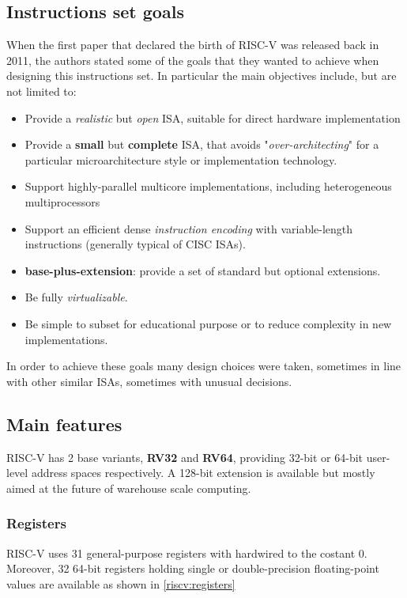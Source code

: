\documentclass[12pt,oneside,a4paper]{article}
\begin{document}
\subsection{Instructions set goals}
When the first paper that declared the birth of RISC-V \cite{risc-v_original} was released back in 2011, the authors stated some of the goals that they wanted to achieve when designing this instructions set. In particular the main objectives include, but are not limited to:
\begin{itemize}
	\item Provide a \textit{realistic} but \textit{open} ISA, suitable for direct hardware implementation
	\item Provide a \textbf{small} but \textbf{complete} ISA, that avoids "\textit{over-architecting}" for a particular microarchitecture style or implementation technology.
	\item Support highly-parallel multicore implementations, including heterogeneous multiprocessors
	\item Support an efficient dense \textit{instruction encoding} with variable-length instructions (generally typical of CISC ISAs).
	\item \textbf{base-plus-extension}: provide a set of standard but optional extensions.
	\item Be fully \textit{virtualizable}.
	\item Be simple to subset for educational purpose or to reduce complexity in new implementations.
\end{itemize}
In order to achieve these goals many design choices were taken, sometimes in line with other similar ISAs, sometimes with unusual decisions.

\subsection{Main features}
RISC-V has 2 base variants, \textbf{RV32} and \textbf{RV64}, providing 32-bit or 64-bit user-level address spaces respectively. A 128-bit extension is available but mostly aimed at the future of warehouse scale computing.
\subsubsection{Registers}
RISC-V uses 31 general-purpose registers  {\selectfont{x1-x31}} with  {\selectfont{x0}} hardwired to the costant 0. Moreover, 32 64-bit registers {\selectfont{f0-f31}} holding single or double-precision floating-point values are available as shown in \cref{riscv:registers}
\end{document}
